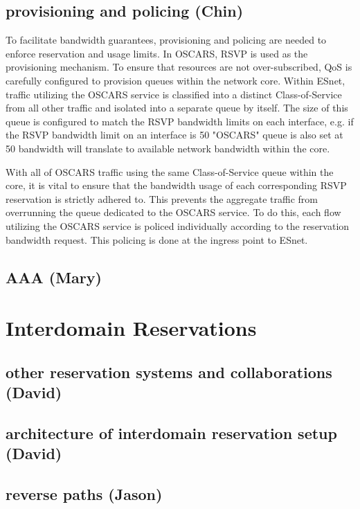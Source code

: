 \documentclass[conference]{IEEEtran}
\begin{document}
\subsection{provisioning and policing (Chin)}
To facilitate bandwidth guarantees, provisioning and policing are needed to 
enforce reservation and usage limits.  In OSCARS, RSVP is used as the 
provisioning mechanism.  To ensure that resources are not over-subscribed, QoS is 
carefully configured to provision queues within the network core.  Within ESnet, 
traffic utilizing the OSCARS service is classified into a distinct 
Class-of-Service from all other traffic and isolated into a separate queue by 
itself.  The size of this queue is configured to match the RSVP bandwidth limits 
on each interface, e.g. if the RSVP bandwidth limit on an interface is 50%
"OSCARS" queue is also set at 50%
bandwidth will translate to available network bandwidth within the core.

With all of OSCARS traffic using the same Class-of-Service queue within the core, 
it is vital to ensure that the bandwidth usage of each corresponding RSVP 
reservation is strictly adhered to.  This prevents the aggregate traffic from 
overrunning the queue dedicated to the OSCARS service.  To do this, each flow 
utilizing the OSCARS service is policed individually according to the reservation 
bandwidth request.  This policing is done at the ingress point to ESnet.

\subsection{AAA (Mary)}

\section{Interdomain Reservations}
\subsection{other reservation systems and collaborations (David)}
\subsection{architecture of interdomain reservation setup (David)}
\subsection{reverse paths (Jason)}
\end{document}
